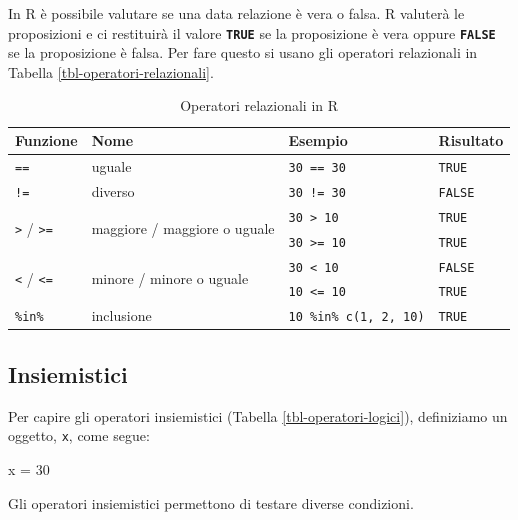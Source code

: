 \documentclass[
  a4paper,
  DIV=11,
  numbers=noendperiod]{scrreprt}
\newenvironment{Shaded}{\begin{snugshade}}{\end{snugshade}}
\newcommand{\DecValTok}[1]{\textcolor[rgb]{0.00,0.00,0.81}{#1}}
\newcommand{\NormalTok}[1]{#1}
\newcommand{\OtherTok}[1]{\textcolor[rgb]{0.56,0.35,0.01}{#1}}
\begin{document}
In R è possibile valutare se una data relazione è vera o falsa. R
valuterà le proposizioni e ci restituirà il valore
\textbf{\texttt{TRUE}} se la proposizione è vera oppure
\textbf{\texttt{FALSE}} se la proposizione è falsa. Per fare questo si
usano gli operatori relazionali in Tabella
\ref{tbl-operatori-relazionali}.

\begin{table}[htbp]
\centering
\caption{Operatori relazionali in R}
\label{tbl:operatori-relazionali}
\begin{tabular}{llll}
\toprule
Funzione & Nome & Esempio & Risultato \\
\midrule
\texttt{==} & uguale  & \texttt{30 == 30} & \texttt{TRUE}  \\
\texttt{!=} & diverso & \texttt{30 != 30} & \texttt{FALSE} \\
\multirow{2}{*}{\texttt{>} / \texttt{>=}} & \multirow{2}{*}{maggiore / maggiore o uguale}
            & \texttt{30 > 10}  & \texttt{TRUE}  \\
            &  & \texttt{30 >= 10} & \texttt{TRUE}  \\
\multirow{2}{*}{\texttt{<} / \texttt{<=}} & \multirow{2}{*}{minore / minore o uguale}
            & \texttt{30 < 10}  & \texttt{FALSE} \\
            &  & \texttt{10 <= 10} & \texttt{TRUE}  \\
\texttt{\%in\%} & inclusione & \texttt{10 \%in\% c(1, 2, 10)} & \texttt{TRUE} \\
\bottomrule
\end{tabular}
\end{table}

\subsection{Insiemistici}\label{insiemistici}

Per capire gli operatori insiemistici (Tabella
\ref{tbl-operatori-logici}), definiziamo un oggetto, \texttt{x}, come
segue:

\begin{Shaded}
\begin{Highlighting}[]
\NormalTok{x }\OtherTok{=} \DecValTok{30} 
\end{Highlighting}
\end{Shaded}

Gli operatori insiemistici permettono di testare diverse condizioni.
\end{document}
